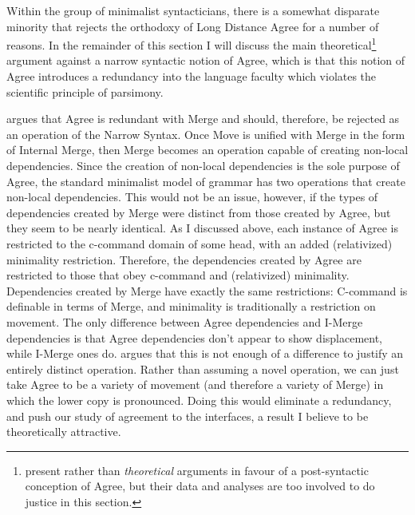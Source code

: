 \documentclass[MilwayThesis]{subfiles}
\begin{document}
Within the group of minimalist syntacticians, there is a somewhat disparate minority that rejects the orthodoxy of Long Distance Agree for a number of reasons.
In the remainder of this section I will discuss the main theoretical\footnote{
	\textcite{bobaljik2008wheres,arregi2013contextual} present \textcite{empirical} rather than \textit{theoretical} arguments in favour of a post-syntactic conception of Agree, but their data and analyses are too involved to do justice in this section. 
} argument against a narrow syntactic notion of Agree, which is that this notion of Agree introduces a redundancy into the language faculty which violates the scientific principle of parsimony.

\textcite{hornstein2009theory} argues that Agree is redundant with Merge and should, therefore, be rejected as an operation of the Narrow Syntax.
Once Move is unified with Merge in the form of Internal Merge, then Merge becomes an operation capable of creating non-local dependencies.
Since the creation of non-local dependencies is the sole purpose of Agree, the standard minimalist model of grammar has two operations that create non-local dependencies.
This would not be an issue, however, if the types of dependencies created by Merge were distinct from those created by Agree, but they seem to be nearly identical.
As I discussed above, each instance of Agree is restricted to the c-command domain of some head, with an added (relativized) minimality restriction.
Therefore, the dependencies created by Agree are restricted to those that obey c-command and (relativized) minimality.
Dependencies created by Merge have exactly the same restrictions:
C-command is definable in terms of Merge, and minimality is traditionally a restriction on movement.
The only difference between Agree dependencies and I-Merge dependencies is that Agree dependencies don't appear to show displacement, while I-Merge ones do.
\textcite{hornstein2009theory} argues that this is not enough of a difference to justify an entirely distinct operation.
Rather than assuming a novel operation, we can just take Agree to be a variety of movement (and therefore a variety of Merge) in which the lower copy is pronounced.
Doing this would eliminate a redundancy, and push our study of agreement to the interfaces, a result I believe to be theoretically attractive.
\end{document}
